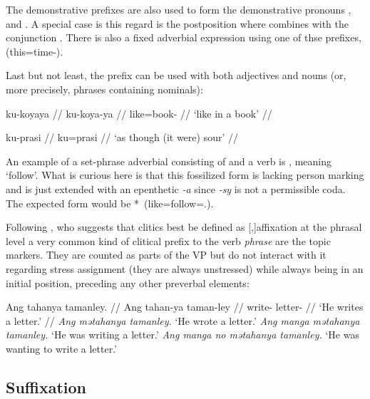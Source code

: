 The demonstrative prefixes are also used to form the demonstrative 
pronouns , 
 and . A special case is 
this regard is the postposition  
where  combines with the conjunction . There is also a fixed adverbial expression using one of 
thse prefixes,  
(this=time-\Dat{}).

Last but not least, the prefix  can be used 
with both adjectives and nouns (or, more precisely, phrases containing 
nominals):

\pex
\a\begingl
	\gla ku-koyaya //
	\glb ku-koya-ya //
	\glc like=book-\Loc{} //
	\glft `like in a book' //
\endgl

\a\begingl
	\gla ku-prasi //
	\glb ku=prasi //
	\glft `as though (it were) sour' //
\endgl
\xe

An example of a set-phrase adverbial consisting of  and a verb 
is ,  meaning `follow'. 
What is curious here is that this fossilized form is lacking person marking 
and is just extended with an epenthetic \textit{-a} since \textit{-sy} is not 
a permissible coda. The expected form would be 
*\, (like=follow=\TsgI{}.\Aarg{}).

Following \citet{klavans1985}, who suggests that clitics best be defined as 
[,]{affixation at the phrasal level} a very common 
kind of clitical prefix to the verb \emph{phrase} are the topic markers. They 
are counted as parts of the VP but do not interact with it regarding stress 
assignment (they are always unstressed) while always being in an initial 
position, preceding any other preverbal elements:

\pex
	\a\begingl
		\gla Ang tahanya tamanley. //
		\glb Ang tahan-ya taman-ley //
		\glc \AgtT{} write-\TsgM{} letter-\PargI{} //
		\glft `He writes a letter.' //
	\endgl
	\a \textit{Ang mətahanya tamanley.} `He wrote a letter.'
	\a \textit{Ang manga mətahanya tamanley.} `He was writing a letter.'
	\a \textit{Ang manga no mətahanya tamanley.} `He was wanting to write a 
		letter.'
\xe

\subsection{Suffixation}

